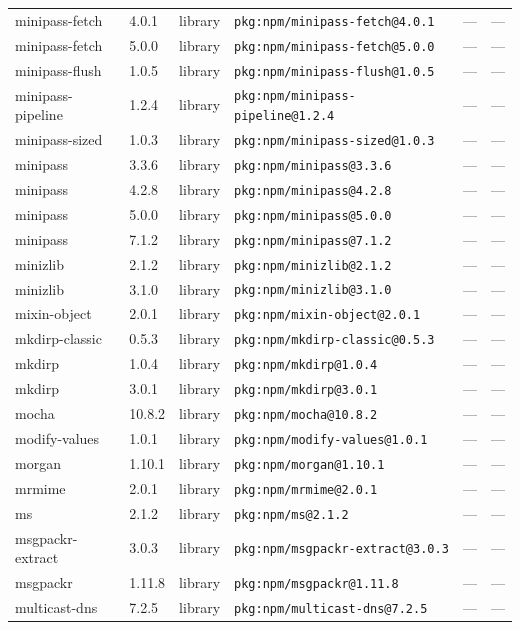\documentclass[11pt]{article}
\begin{document}
\begin{longtable}{|l|l|l|p{2.2cm}|l|p{4cm}|}
minipass-fetch & 4.0.1 & library & \texttt{pkg:npm/minipass-fetch@4.0.1} & — & — \\
minipass-fetch & 5.0.0 & library & \texttt{pkg:npm/minipass-fetch@5.0.0} & — & — \\
minipass-flush & 1.0.5 & library & \texttt{pkg:npm/minipass-flush@1.0.5} & — & — \\
minipass-pipeline & 1.2.4 & library & \texttt{pkg:npm/minipass-pipeline@1.2.4} & — & — \\
minipass-sized & 1.0.3 & library & \texttt{pkg:npm/minipass-sized@1.0.3} & — & — \\
minipass & 3.3.6 & library & \texttt{pkg:npm/minipass@3.3.6} & — & — \\
minipass & 4.2.8 & library & \texttt{pkg:npm/minipass@4.2.8} & — & — \\
minipass & 5.0.0 & library & \texttt{pkg:npm/minipass@5.0.0} & — & — \\
minipass & 7.1.2 & library & \texttt{pkg:npm/minipass@7.1.2} & — & — \\
minizlib & 2.1.2 & library & \texttt{pkg:npm/minizlib@2.1.2} & — & — \\
minizlib & 3.1.0 & library & \texttt{pkg:npm/minizlib@3.1.0} & — & — \\
mixin-object & 2.0.1 & library & \texttt{pkg:npm/mixin-object@2.0.1} & — & — \\
mkdirp-classic & 0.5.3 & library & \texttt{pkg:npm/mkdirp-classic@0.5.3} & — & — \\
mkdirp & 1.0.4 & library & \texttt{pkg:npm/mkdirp@1.0.4} & — & — \\
mkdirp & 3.0.1 & library & \texttt{pkg:npm/mkdirp@3.0.1} & — & — \\
mocha & 10.8.2 & library & \texttt{pkg:npm/mocha@10.8.2} & — & — \\
modify-values & 1.0.1 & library & \texttt{pkg:npm/modify-values@1.0.1} & — & — \\
morgan & 1.10.1 & library & \texttt{pkg:npm/morgan@1.10.1} & — & — \\
mrmime & 2.0.1 & library & \texttt{pkg:npm/mrmime@2.0.1} & — & — \\
ms & 2.1.2 & library & \texttt{pkg:npm/ms@2.1.2} & — & — \\
msgpackr-extract & 3.0.3 & library & \texttt{pkg:npm/msgpackr-extract@3.0.3} & — & — \\
msgpackr & 1.11.8 & library & \texttt{pkg:npm/msgpackr@1.11.8} & — & — \\
multicast-dns & 7.2.5 & library & \texttt{pkg:npm/multicast-dns@7.2.5} & — & — \\

\end{longtable}
\end{document}
